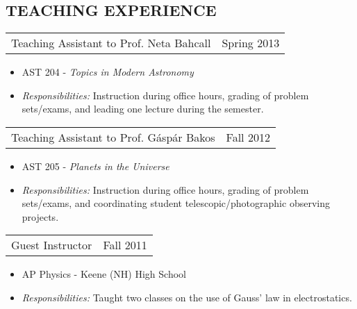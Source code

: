 \documentclass[margin]{res}
\begin{document}
\begin{resume}
\section{TEACHING EXPERIENCE}
				 \begin{tabular}{@{}p{4.3in} r}
				 Teaching Assistant to Prof. Neta
                                 Bahcall & Spring 2013
				 \end{tabular}
				 \begin{itemize}
				 \item[] AST 204 - \textit{Topics in
                                   Modern Astronomy} \item[] \textit{Responsibilities:}
                                   Instruction during office hours,
                                   grading of problem sets/exams, and
                                   leading one lecture during the
                                   semester.
				 \end{itemize}
				 
				 \begin{tabular}{@{}p{4.3in} r}
				 Teaching Assistant to
                                 Prof. G\'asp\'ar Bakos & Fall 2012
				 \end{tabular}
				 \begin{itemize}
				 \item[] AST 205 - \textit{Planets in
                                   the Universe}
				 \item[] \textit{Responsibilities:}
                                   Instruction during office hours,
                                   grading of problem sets/exams, and
                                   coordinating student
                                   telescopic/photographic observing
                                   projects.
                                 \end{itemize}

                                 \begin{tabular}{@{}p{4.3in} r}
                                 Guest Instructor & Fall 2011
                                 \end{tabular}
                                 \begin{itemize}
                                 \item[] AP Physics - Keene (NH) High School
                                 \item[] \textit{Responsibilities:}
                                   Taught two classes on the use of
                                   Gauss' law in electrostatics.
                                 \end{itemize}
			

\end{resume}
\end{document}

